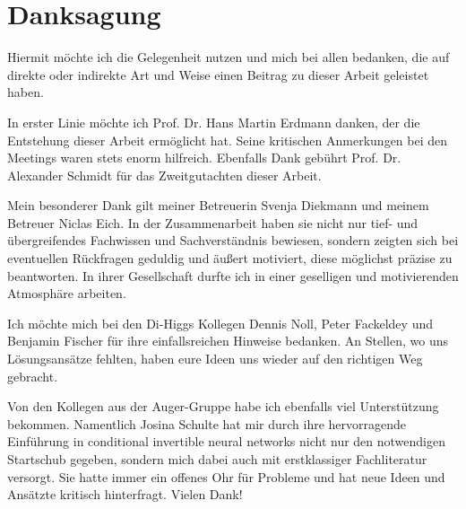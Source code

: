 \section*{Danksagung}

Hiermit möchte ich die Gelegenheit nutzen und mich bei allen bedanken, die auf direkte oder indirekte Art und Weise einen Beitrag zu dieser Arbeit geleistet haben.

In erster Linie möchte ich Prof. Dr. Hans Martin Erdmann danken, der die Entstehung dieser Arbeit ermöglicht hat. Seine kritischen Anmerkungen bei den Meetings waren stets enorm hilfreich. Ebenfalls Dank gebührt Prof. Dr. Alexander Schmidt für das Zweitgutachten dieser Arbeit.

Mein besonderer Dank gilt meiner Betreuerin Svenja Diekmann und meinem Betreuer Niclas Eich. In der Zusammenarbeit haben sie nicht nur tief- und übergreifendes Fachwissen und Sachverständnis bewiesen, sondern zeigten sich bei eventuellen Rückfragen geduldig und äußert motiviert, diese möglichst präzise zu beantworten. In ihrer Gesellschaft durfte ich in einer geselligen und motivierenden Atmosphäre arbeiten.

Ich möchte mich bei den Di-Higgs Kollegen Dennis Noll, Peter Fackeldey und Benjamin Fischer für ihre einfallsreichen Hinweise bedanken. An Stellen, wo uns Lösungsansätze fehlten, haben eure Ideen uns wieder auf den richtigen Weg gebracht.

Von den Kollegen aus der Auger-Gruppe habe ich ebenfalls viel Unterstützung bekommen. Namentlich Josina Schulte hat mir durch ihre hervorragende Einführung in conditional invertible neural networks nicht nur den notwendigen Startschub gegeben, sondern mich dabei auch mit erstklassiger Fachliteratur versorgt. Sie hatte immer ein offenes Ohr für Probleme und hat neue Ideen und Ansätzte kritisch hinterfragt.
Vielen Dank!